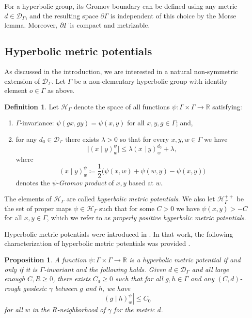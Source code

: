 \documentclass[twoside]{amsart}
\newtheorem{proposition}[theorem]{Proposition}
\theoremstyle{definition}
\newtheorem{definition}[theorem]{Definition}
\numberwithin{equation}{section}
\numberwithin{theorem}{section}
\newcommand{\R}{\mathbb{R}}
\newcommand{\calD}{\mathcal{D}}
\newcommand{\Dc}{{\mathcal D}}
\newcommand{\calH}{\mathcal{H}}
\newcommand{\G}{\Gamma}
\newcommand{\p}{\psi}
\newcommand{\gpr}[2]{(#1 \mid#2)}
\newcommand{\pG}{\partial \G}
\begin{document}
For a hyperbolic group, its Gromov boundary can be defined using any metric $d\in \calD_\G$, and the resulting space $\pG$ is independent of this choice by the Morse lemma. Moreover, $\pG$ is compact and metrizable.





\subsection{Hyperbolic metric potentials}\label{sec:HMP}
As discussed in the introduction, we are interested in a natural non-symmetric extension of $\Dc_\G$. Let $\G$ be a non-elementary hyperbolic group with identity element $o \in \G$ as above.

\begin{definition}\label{def:HMP}
Let $\calH_\G$ denote the space of all functions
$\psi \colon \G \times \G \to \mathbb{R}$ satisfying:
\begin{enumerate}
\item $\G$-invariance: $\psi(gx,gy)=\psi(x,y)$ for all $x,y,g \in \G$; and,
\item for any $d_0 \in \calD_\G$ there exists $\lambda>0$ so that for every
$x,y,w \in \G$ we have
\[
\bigl|\gpr{x}{y}_w^\psi\bigr|
\leq \lambda \gpr{x}{y}_w^{d_0} + \lambda ,
\]
where
\[
\gpr{x}{y}_w^\psi \coloneqq
\frac{1}{2}\bigl(\psi(x,w)+\psi(w,y) - \psi(x,y)\bigr)
\]
denotes the $\psi$-\emph{Gromov product} of $x,y$ based at $w$.
\end{enumerate}
The elements of $\calH_\G$ are called \emph{hyperbolic metric potentials}.
We also let $\calH^{++}_\G$ be the set of proper maps $\psi \in \calH_\G$
such that for some $C>0$ we have $\psi(x,y)>-C$ for all $x,y \in \G$, which we refer to as \emph{properly positive hyperbolic metric potentials}.
\end{definition}

Hyperbolic metric potentials were introduced in \cite{CRS}.
In that work, the following characterization of hyperbolic metric potentials was provided \cite[Proposition~3.1]{CRS}.

\begin{proposition}\label{prop:criterionHMP}
    A function $\p: \Gamma \times \Gamma \to \R$ is a hyperbolic metric potential if and only if it is $\Gamma$-invariant and the following holds. Given $d\in \calD_\G$ and all large enough $C, R \ge 0$, there exists $C_0 \ge 0$ such that for all $g,h\in \G$ and any $(C,d)$-rough geodesic $\gamma$ between $g$ and $h$, we have
\begin{equation*}
|\gpr{g}{h}_w^\p| \le C_0
\end{equation*}
for all $w$ in the $R$-neighborhood of $\gamma$ for the metric $d$.
\end{proposition}
\end{document}
